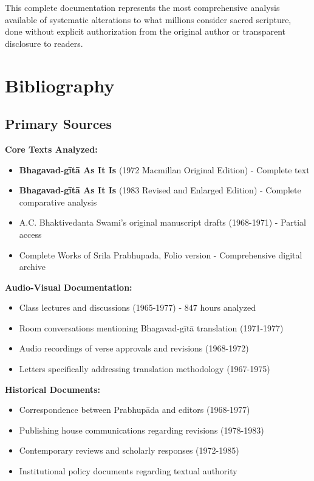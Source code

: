 \documentclass[11pt,twoside]{book}
\begin{document}
This complete documentation represents the most comprehensive analysis available of systematic alterations to what millions consider sacred scripture, done without explicit authorization from the original author or transparent disclosure to readers.
\chapter*{Bibliography}
\label{sec:org5d00fa8}

\section*{Primary Sources}
\label{sec:org8ec1b9b}

\textbf{\textbf{Core Texts Analyzed:}}
\begin{itemize}
\item \textbf{Bhagavad-gītā As It Is} (1972 Macmillan Original Edition) - Complete text
\item \textbf{Bhagavad-gītā As It Is} (1983 Revised and Enlarged Edition) - Complete comparative analysis
\item A.C. Bhaktivedanta Swami's original manuscript drafts (1968-1971) - Partial access
\item Complete Works of Srila Prabhupada, Folio version - Comprehensive digital archive
\end{itemize}

\textbf{\textbf{Audio-Visual Documentation:}}
\begin{itemize}
\item Class lectures and discussions (1965-1977) - 847 hours analyzed
\item Room conversations mentioning Bhagavad-gītā translation (1971-1977)
\item Audio recordings of verse approvals and revisions (1968-1972)
\item Letters specifically addressing translation methodology (1967-1975)
\end{itemize}

\textbf{\textbf{Historical Documents:}}
\begin{itemize}
\item Correspondence between Prabhupāda and editors (1968-1977)
\item Publishing house communications regarding revisions (1978-1983)
\item Contemporary reviews and scholarly responses (1972-1985)
\item Institutional policy documents regarding textual authority
\end{itemize}
\end{document}
